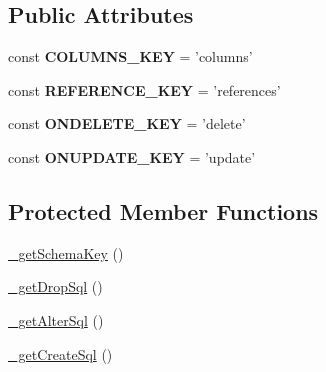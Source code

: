 \subsection*{Public Attributes}
\begin{DoxyCompactItemize}
\item 
\hypertarget{classZendDbSchema__Db__Schema__Table__ForeignKey_a7818dea405ce8ace66ff2c57aea94576}{const {\bfseries C\-O\-L\-U\-M\-N\-S\-\_\-\-K\-E\-Y} = 'columns'}\label{classZendDbSchema__Db__Schema__Table__ForeignKey_a7818dea405ce8ace66ff2c57aea94576}

\item 
\hypertarget{classZendDbSchema__Db__Schema__Table__ForeignKey_a400c9c052aac6cfe7f493896423f0a91}{const {\bfseries R\-E\-F\-E\-R\-E\-N\-C\-E\-\_\-\-K\-E\-Y} = 'references'}\label{classZendDbSchema__Db__Schema__Table__ForeignKey_a400c9c052aac6cfe7f493896423f0a91}

\item 
\hypertarget{classZendDbSchema__Db__Schema__Table__ForeignKey_aaaacf28bd521067dd4590d70a6a8512e}{const {\bfseries O\-N\-D\-E\-L\-E\-T\-E\-\_\-\-K\-E\-Y} = 'delete'}\label{classZendDbSchema__Db__Schema__Table__ForeignKey_aaaacf28bd521067dd4590d70a6a8512e}

\item 
\hypertarget{classZendDbSchema__Db__Schema__Table__ForeignKey_a6d4cdf34ffbfd24ec763dbe4ee111cce}{const {\bfseries O\-N\-U\-P\-D\-A\-T\-E\-\_\-\-K\-E\-Y} = 'update'}\label{classZendDbSchema__Db__Schema__Table__ForeignKey_a6d4cdf34ffbfd24ec763dbe4ee111cce}

\end{DoxyCompactItemize}
\subsection*{Protected Member Functions}
\begin{DoxyCompactItemize}
\item 
\hyperlink{classZendDbSchema__Db__Schema__Table__ForeignKey_ad6d46e4848466e60cdcfc327e642d97e}{\-\_\-get\-Schema\-Key} ()
\item 
\hyperlink{classZendDbSchema__Db__Schema__Table__ForeignKey_af8a9854e00b6cb81885bfce513ef022c}{\-\_\-get\-Drop\-Sql} ()
\item 
\hyperlink{classZendDbSchema__Db__Schema__Table__ForeignKey_ae7cb55b4ec471ccb54ef38ef4bb33558}{\-\_\-get\-Alter\-Sql} ()
\item 
\hyperlink{classZendDbSchema__Db__Schema__Table__ForeignKey_a8b8ab754bf3b5bcda1e8c70e83a6b7b9}{\-\_\-get\-Create\-Sql} ()
\end{DoxyCompactItemize}
